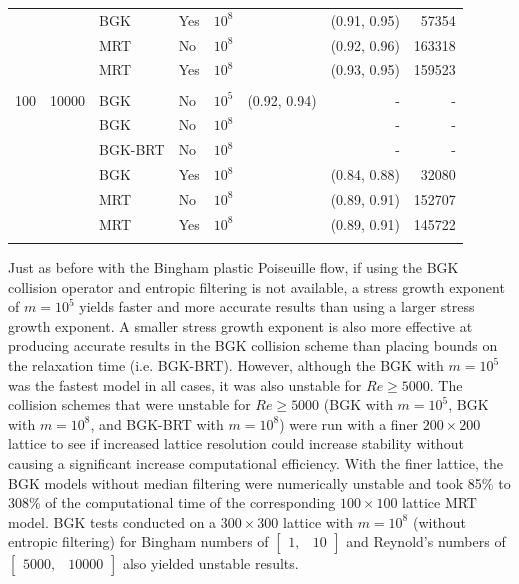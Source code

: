 \begin{table}
\begin{tabulary}{\linewidth}{r r l l r r r r}
    &      & BGK     & Yes & $10^8$ &              & (0.91, 0.95) & 57354 \\
    &      & MRT     & No  & $10^8$ &              & (0.92, 0.96) & 163318 \\
    &      & MRT     & Yes & $10^8$ &              & (0.93, 0.95) & 159523 \\
\\
100 & 10000 & BGK     & No  & $10^5$ & (0.92, 0.94) & - & - \\
    &       & BGK     & No  & $10^8$ &              & - & - \\
    &       & BGK-BRT & No  & $10^8$ &              & - & - \\
    &       & BGK     & Yes & $10^8$ &              & (0.84, 0.88) & 32080 \\
    &       & MRT     & No  & $10^8$ &              & (0.89, 0.91) & 152707 \\
    &       & MRT     & Yes & $10^8$ &              & (0.89, 0.91) & 145722 \\
\\
\end{tabulary}
\label{tab:lid-bing100}
\end{table}

Just as before with the Bingham plastic Poiseuille flow, if using the BGK collision operator and entropic filtering is not available, a stress growth exponent of $m = 10^5$ yields faster and more accurate results than using a larger stress growth exponent.
A smaller stress growth exponent is also more effective at producing accurate results in the BGK collision scheme than placing bounds on the relaxation time (i.e. BGK-BRT).
However, although the BGK with $m = 10^5$ was the fastest model in all cases, it was also unstable for $Re \ge 5000$.
The collision schemes that were unstable for $Re \ge 5000$ (BGK with $m = 10^5$, BGK with $m = 10^8$, and BGK-BRT with $m = 10^8$) were run with a finer $200 \times 200$ lattice to see if increased lattice resolution could increase stability without causing a significant increase computational efficiency.
With the finer lattice, the BGK models without median filtering were numerically unstable and took 85\% to 308\% of the computational time of the corresponding $100 \times 100$ lattice MRT model.
BGK tests conducted on a $300 \times 300$ lattice with $m = 10^8$ (without entropic filtering) for Bingham numbers of $\begin{bmatrix}1,&10\end{bmatrix}$ and Reynold’s numbers of $\begin{bmatrix}5000,&10000\end{bmatrix}$ also yielded unstable results.

